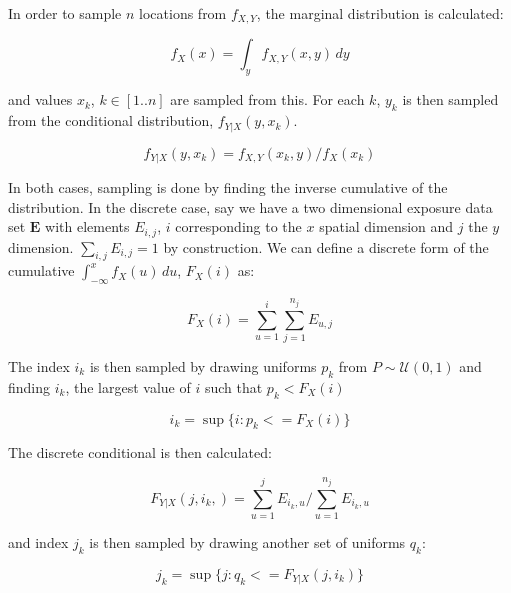 \documentclass[a4paper,11pt]{extarticle} %
\theoremstyle{definition}
\begin{document}
In order to sample $n$ locations from $f_{X, Y}$, the marginal distribution is calculated:

\begin{equation}
    \label{Eq:Disagg2}
    f_X(x) = \int_{y} f_{X, Y}(x, y) \, dy
\end{equation}

and values $x_k$, $k \in [1..n]$ are sampled from this. For each $k$, $y_k$ is then sampled from the conditional distribution, $f_{Y|X}(y, x_k)$.

\begin{equation}
    \label{Eq:Disagg3}
    f_{Y|X}(y, x_k) = f_{X, Y}(x_k, y) / f_X(x_k)
\end{equation}

In both cases, sampling is done by finding the inverse cumulative of the distribution. In the discrete case, say we have a two dimensional exposure data set $\mathbf{E}$ with elements $E_{i, j}$, $i$ corresponding to the $x$ spatial dimension and $j$ the $y$ dimension. $\sum_{i,j} E_{i,j} = 1$ by construction. We can define a discrete form of the cumulative $\int_{-\infty}^{x} f_X(u) \, du$, $F_X(i)$ as:

\begin{equation}
    \label{Eq:Disagg4}
    F_X(i) = \sum_{u = 1}^{i} \sum_{j=1}^{n_j} E_{u, j}
\end{equation}

The index $i_k$ is then sampled by drawing uniforms $p_k$ from $P \sim \mathcal{U}(0, 1)$ and finding $i_k$, the largest value of $i$ such that $p_k < F_X(i)$

\begin{equation}
    \label{Eq:Disagg4}
    i_k = \sup \{ i : p_k <= F_X(i) \}
\end{equation}

The discrete conditional is then calculated:

\begin{equation}
    \label{Eq:Disagg5}
    F_{Y|X}(j, i_k,) = \sum_{u = 1}^{j} E_{i_k, u} / \sum_{u = 1}^{n_j} E_{i_k, u}
\end{equation}

and index $j_k$ is then sampled by drawing another set of uniforms $q_k$:

\begin{equation}
    \label{Eq:Disagg4}
    j_k = \sup \{ j : q_k <= F_{Y|X}(j, i_k) \}
\end{equation}

\clearpage
\printglossaries
\clearpage


%

%
\end{document}
